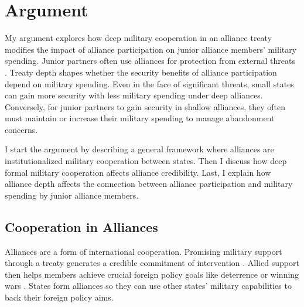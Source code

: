 \documentclass[12pt]{article}
\begin{document}
\section{Argument}

My argument explores how deep military cooperation in an alliance treaty modifies the impact of alliance participation on junior alliance members' military spending.
Junior partners often use alliances for protection from external threats \citep{Morrow1991}. 
Treaty depth shapes whether the security benefits of alliance participation depend on military spending. 
Even in the face of significant threats, small states can gain more security with less military spending under deep alliances. 
Conversely, for junior partners to gain security in shallow alliances, they often must maintain or increase their military spending to manage abandonment concerns. 




I start the argument by describing a general framework where alliances are institutionalized military cooperation between states. 
Then I discuss how deep formal military cooperation affects alliance credibility. 
Last, I explain how alliance depth affects the connection between alliance participation and military spending by junior alliance members. 


\subsection{Cooperation in Alliances}

Alliances are a form of international cooperation. 
Promising military support through a treaty generates a credible commitment of intervention \citep{Fearon1997, Morrow2000}. 
Allied support then helps members achieve crucial foreign policy goals like deterrence or winning wars \citep{Walt1990, Snyder1997}. 
States form alliances so they can use other states' military capabilities to back their foreign policy aims.
\end{document}
